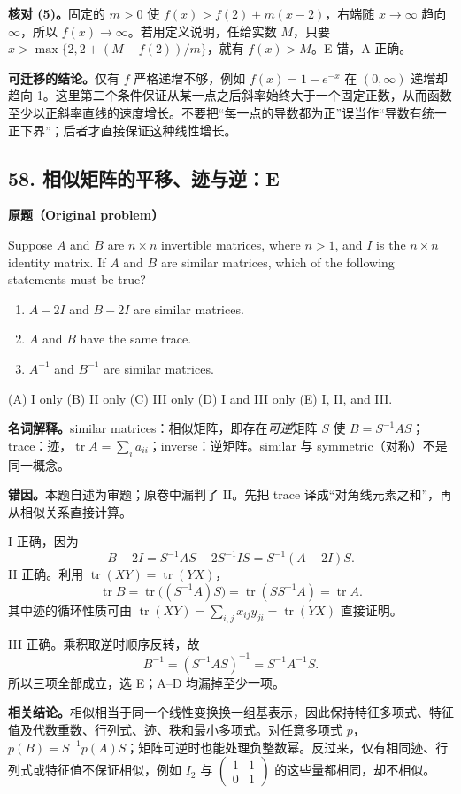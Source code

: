 \documentclass[11pt,a4paper,fontset=fandol]{ctexart}
\begin{document}
\textbf{核对 (5)。}固定的 $m>0$ 使 $f(x)>f(2)+m(x-2)$，右端随 $x\to\infty$ 趋向 $\infty$，所以 $f(x)\to\infty$。若用定义说明，任给实数 $M$，只要 $x>\max\{2,2+(M-f(2))/m\}$，就有 $f(x)>M$。E 错，A 正确。

\textbf{可迁移的结论。}仅有 $f$ 严格递增不够，例如 $f(x)=1-e^{-x}$ 在 $(0,\infty)$ 递增却趋向 1。这里第二个条件保证从某一点之后斜率始终大于一个固定正数，从而函数至少以正斜率直线的速度增长。不要把“每一点的导数都为正”误当作“导数有统一正下界”；后者才直接保证这种线性增长。

\subsection{58. 相似矩阵的平移、迹与逆：E}
\label{p2:q58}
\textbf{原题（Original problem）}

Suppose $A$ and $B$ are $n\times n$ invertible matrices, where $n>1$, and $I$ is the $n\times n$ identity matrix. If $A$ and $B$ are similar matrices, which of the following statements must be true?
\begin{enumerate}[label=\Roman*.]
\item $A-2I$ and $B-2I$ are similar matrices.
\item $A$ and $B$ have the same trace.
\item $A^{-1}$ and $B^{-1}$ are similar matrices.
\end{enumerate}
(A) I only \quad (B) II only \quad (C) III only \quad (D) I and III only \quad (E) I, II, and III.

\textbf{名词解释。}similar matrices：相似矩阵，即存在\emph{可逆}矩阵 $S$ 使 $B=S^{-1}AS$；trace：迹，$\operatorname{tr}A=\sum_i a_{ii}$；inverse：逆矩阵。similar 与 symmetric（对称）不是同一概念。

\textbf{错因。}本题自述为审题；原卷中漏判了 II。先把 trace 译成“对角线元素之和”，再从相似关系直接计算。

I 正确，因为
\[
B-2I=S^{-1}AS-2S^{-1}IS=S^{-1}(A-2I)S.
\]
II 正确。利用 $\operatorname{tr}(XY)=\operatorname{tr}(YX)$，
\[
\operatorname{tr}B=\operatorname{tr}\bigl((S^{-1}A)S\bigr)
=\operatorname{tr}(SS^{-1}A)=\operatorname{tr}A.
\]
其中迹的循环性质可由 $\operatorname{tr}(XY)=\sum_{i,j}x_{ij}y_{ji}=\operatorname{tr}(YX)$ 直接证明。

III 正确。乘积取逆时顺序反转，故
\[
B^{-1}=(S^{-1}AS)^{-1}=S^{-1}A^{-1}S.
\]
所以三项全部成立，选 E；A--D 均漏掉至少一项。

\textbf{相关结论。}相似相当于同一个线性变换换一组基表示，因此保持特征多项式、特征值及代数重数、行列式、迹、秩和最小多项式。对任意多项式 $p$，$p(B)=S^{-1}p(A)S$；矩阵可逆时也能处理负整数幂。反过来，仅有相同迹、行列式或特征值不保证相似，例如 $I_2$ 与 $\begin{pmatrix}1&1\\0&1\end{pmatrix}$ 的这些量都相同，却不相似。
\end{document}
